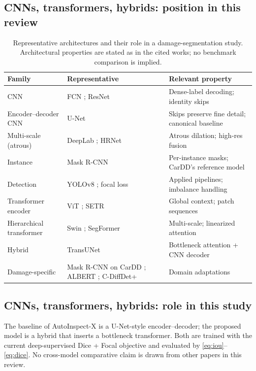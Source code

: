 \documentclass[conference]{IEEEtran}
\begin{document}
\subsection{CNNs, transformers, hybrids: position in this review}
\begin{table}[!t]
\setlength{\tabcolsep}{4.5pt}
\renewcommand{\arraystretch}{1.15}
\caption{Representative architectures and their role in a damage-segmentation
study. Architectural properties are stated as in the cited works; no benchmark
comparison is implied.}
\label{tab:arch}
\centering
\begin{tabular}{@{}p{2.1cm}p{1.9cm}p{3.4cm}@{}}
\toprule
\textbf{Family} & \textbf{Representative} & \textbf{Relevant property}\\
\midrule
CNN & FCN \cite{fcn2015}; ResNet \cite{resnet2016} & Dense-label decoding; identity skips\\
Encoder--decoder CNN & U-Net \cite{unet2015} & Skips preserve fine detail; canonical baseline\\
Multi-scale (atrous) & DeepLab \cite{deeplabv3}; HRNet \cite{hrnet2020} & Atrous dilation; high-res fusion\\
Instance & Mask R-CNN \cite{maskrcnn2017} & Per-instance masks; CarDD's reference model\\
Detection & YOLOv8 \cite{yolov8}; focal loss \cite{lin2017focal} & Applied pipelines; imbalance handling\\
Transformer encoder & ViT \cite{vit2021}; SETR \cite{setr2021} & Global context; patch sequences\\
Hierarchical transformer & Swin \cite{swin2021}; SegFormer \cite{segformer2021} & Multi-scale; linearized attention\\
Hybrid & TransUNet \cite{transunet2021} & Bottleneck attention + CNN decoder\\
Damage-specific & Mask R-CNN on CarDD \cite{cardd2023}; ALBERT \cite{albert2025}; C-DiffDet+ \cite{cdiffdet2025} & Domain adaptations\\
\bottomrule
\end{tabular}
\end{table}

\subsection{CNNs, transformers, hybrids: role in this study}
The baseline of AutoInspect-X is a U-Net-style encoder--decoder; the proposed
model is a hybrid that inserts a bottleneck transformer. Both are trained with
the current deep-supervised Dice + Focal objective and evaluated by
\eqref{eq:iou}--\eqref{eq:dice}. No cross-model comparative claim is drawn from
other papers in this review.
\end{document}
